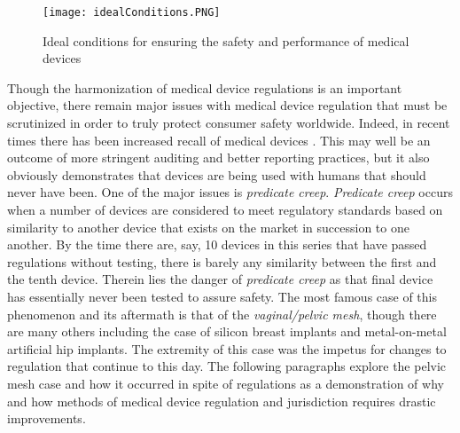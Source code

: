 \documentclass[12pt, openany, oneside]{book}
\begin{document}
\begin{figure}
		\center
		\texttt{[image: idealConditions.PNG]}
	\caption[Regulatory Conditions]{Ideal conditions for ensuring the safety and performance of medical devices \citep{cheng2003}}\label{fig:ideal}
\end{figure}


Though the harmonization of medical device regulations is an important objective, there remain major issues with medical device regulation that must be scrutinized in order to truly protect consumer safety worldwide. Indeed, in recent times there has been increased recall of medical devices \citep{gupta2016medical}. This may well be an outcome of more stringent auditing and better reporting practices, but it also obviously demonstrates that devices are being used with humans that should never have been. One of the major issues is \textit{predicate creep}. \textit{Predicate creep} occurs when a number of devices are considered to meet regulatory standards based on similarity to another device that exists on the market in succession to one another. By the time there are, say, 10 devices in this series that have passed regulations without testing, there is barely any similarity between the first and the tenth device. Therein lies the danger of \textit{predicate creep} as that final device has essentially never been tested to assure safety. The most famous case of this phenomenon and its aftermath is that of the \textit{vaginal/pelvic mesh}, though there are many others including the case of silicon breast implants and metal-on-metal artificial hip implants. The extremity of this case was the impetus for changes to regulation that continue to this day. The following paragraphs explore the pelvic mesh case and how it occurred in spite of regulations as a demonstration of why and how methods of medical device regulation and jurisdiction requires drastic improvements.\\
\end{document}
